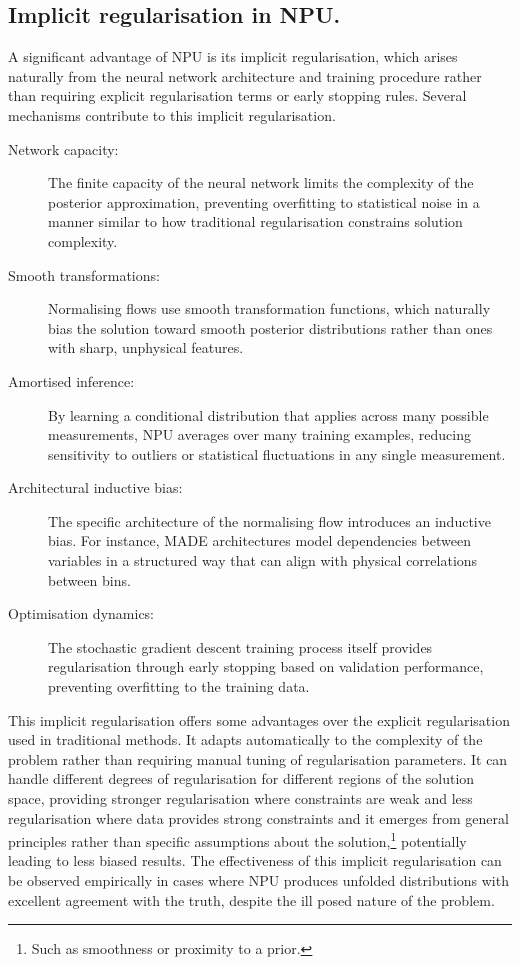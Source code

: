 \subsection{Implicit regularisation in NPU.}
    A significant advantage of NPU is its implicit regularisation, which arises naturally from the neural network architecture and training procedure rather than requiring explicit regularisation terms or early stopping rules.
    Several mechanisms contribute to this implicit regularisation.
    \begin{description}
        \item [Network capacity:] The finite capacity of the neural network limits the complexity of the posterior approximation, preventing overfitting to statistical noise in a manner similar to how traditional regularisation constrains solution complexity.
        \item [Smooth transformations:] Normalising flows use smooth transformation functions, which naturally bias the solution toward smooth posterior distributions rather than ones with sharp, unphysical features.
        \item [Amortised inference:] By learning a conditional distribution that applies across many possible measurements, NPU averages over many training examples, reducing sensitivity to outliers or statistical fluctuations in any single measurement.
        \item [Architectural inductive bias:] The specific architecture of the normalising flow introduces an inductive bias.
        For instance, MADE architectures model dependencies between variables in a structured way that can align with physical correlations between bins.
        \item [Optimisation dynamics:] The stochastic gradient descent training process itself provides regularisation through early stopping based on validation performance, preventing overfitting to the training data.
    \end{description}
    
    This implicit regularisation offers some advantages over the explicit regularisation used in traditional methods.
    It adapts automatically to the complexity of the problem rather than requiring manual tuning of regularisation parameters.
    It can handle different degrees of regularisation for different regions of the solution space, providing stronger regularisation where constraints are weak and less regularisation where data provides strong constraints and
    it emerges from general principles rather than specific assumptions about the solution,\footnote{Such as smoothness or proximity to a prior.} potentially leading to less biased results.
    The effectiveness of this implicit regularisation can be observed empirically in cases where NPU produces unfolded distributions with excellent agreement with the truth, despite the ill posed nature of the problem.

